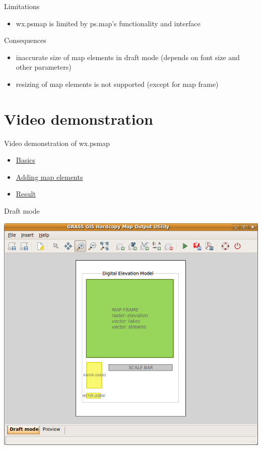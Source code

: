 \documentclass[xcolor=dvipsnames,beamer,compress]{beamer} %
\begin{document}
\begin{frame}{Limitations}
\begin{itemize}
\item 
wx.psmap is limited by ps.map's functionality
and interface
\end{itemize}
\begin{block}{Consequences}
\begin{itemize}
  \item inaccurate size of map elements in draft mode (depends on font size and other parameters)
  \item resizing of map elements is not supported (except for map frame)
\end{itemize}
\end{block}
\end{frame}


\section{Video demonstration}
\begin{frame}{Video demonstration of wx.psmap}
\begin{block}{}
\begin{itemize}
\item\href{basic.avi}{Basics}
\item\href{decorations.avi}{Adding map elements}
\item\href{elevation.pdf}{Result}

\end{itemize}
\end{block}
\hyperlink{conclusion}{}
\end{frame}

\begin{frame}{Draft mode}
\begin{center}
\includegraphics[height=0.8\textheight]{./screenshoty/draft.png}
\end{center}
\end{frame}
\end{document}
